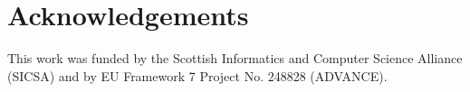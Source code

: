 \documentclass{jfp1}
\newcounter{per}
\begin{document}




%





%

%



\section*{Acknowledgements}

This work was funded by the Scottish Informatics and Computer Science
Alliance (SICSA) and by EU Framework 7 Project No. 248828 (ADVANCE).




\appendix




%
\end{document}
